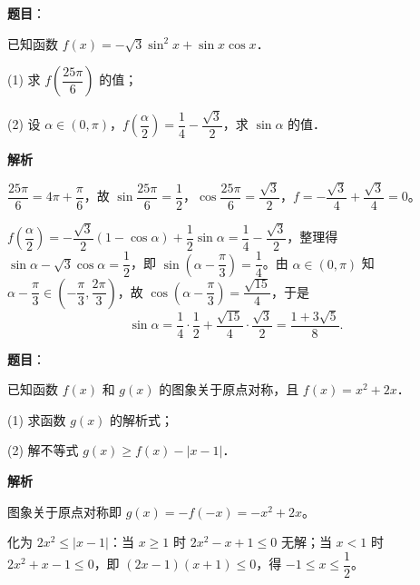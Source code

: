 \begin{answer}

\textbf{题目}：

已知函数 $f(x) = -\sqrt{3}\sin^2 x + \sin x\cos x$．

(1) 求 $f\left(\dfrac{25\pi}{6}\right)$ 的值；

(2) 设 $\alpha \in (0, \pi)$，$f\left(\dfrac{\alpha}{2}\right) = \dfrac{1}{4} - \dfrac{\sqrt{3}}{2}$，求 $\sin\alpha$ 的值．

\textbf{解析}


$\dfrac{25\pi}{6} = 4\pi + \dfrac{\pi}{6}$，故 $\sin\dfrac{25\pi}{6} = \dfrac{1}{2}$，$\cos\dfrac{25\pi}{6} = \dfrac{\sqrt{3}}{2}$，$f = -\dfrac{\sqrt{3}}{4} + \dfrac{\sqrt{3}}{4} = 0$。


$f\left(\dfrac{\alpha}{2}\right) = -\dfrac{\sqrt{3}}{2}(1 - \cos\alpha) + \dfrac{1}{2}\sin\alpha = \dfrac{1}{4} - \dfrac{\sqrt{3}}{2}$，整理得 $\sin\alpha - \sqrt{3}\cos\alpha = \dfrac{1}{2}$，即 $\sin\left(\alpha - \dfrac{\pi}{3}\right) = \dfrac{1}{4}$。由 $\alpha \in (0, \pi)$ 知 $\alpha - \dfrac{\pi}{3} \in \left(-\dfrac{\pi}{3}, \dfrac{2\pi}{3}\right)$，故 $\cos\left(\alpha - \dfrac{\pi}{3}\right) = \dfrac{\sqrt{15}}{4}$，于是
\nopagebreak[4]
\[
\sin\alpha = \frac{1}{4}\cdot\frac{1}{2} + \frac{\sqrt{15}}{4}\cdot\frac{\sqrt{3}}{2} = \frac{1 + 3\sqrt{5}}{8}.
\]



\end{answer}
\begin{answer}

\textbf{题目}：

已知函数 $f(x)$ 和 $g(x)$ 的图象关于原点对称，且 $f(x) = x^2 + 2x$．

(1) 求函数 $g(x)$ 的解析式；

(2) 解不等式 $g(x) \geqslant f(x) - |x - 1|$．

\textbf{解析}


图象关于原点对称即 $g(x) = -f(-x) = -x^2 + 2x$。


化为 $2x^2 \leqslant |x - 1|$：当 $x \geqslant 1$ 时 $2x^2 - x + 1 \leqslant 0$ 无解；当 $x < 1$ 时 $2x^2 + x - 1 \leqslant 0$，即 $(2x - 1)(x + 1) \leqslant 0$，得 $-1 \leqslant x \leqslant \dfrac{1}{2}$。



\end{answer}
